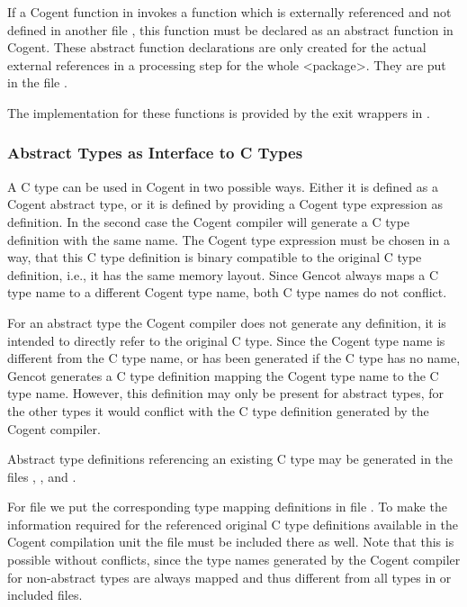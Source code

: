 If a Cogent function in  invokes a function which is externally referenced and not defined in another
file , this function must be declared as an abstract function in Cogent. These abstract function declarations
are only created for the actual
external references in a processing step for the whole <package>. They are put in the file .

The implementation for these functions is provided by the exit wrappers in .

\subsubsection{Abstract Types as Interface to C Types}

A C type can be used in Cogent in two possible ways. Either it is defined as a Cogent abstract type, or it is defined by providing
a Cogent type expression as definition. In the second case the Cogent compiler will generate a C type definition with the
same name. The Cogent type expression must be chosen in a way, that this C type definition is binary compatible to the
original C type definition, i.e., it has the same memory layout. Since Gencot always maps a C type name to a different Cogent
type name, both C type names do not conflict.

For an abstract type the Cogent compiler does not generate any definition, it is intended to directly refer to the original
C type. Since the Cogent type name is different from the C type name, or has been generated if the C type has no name,
Gencot generates a C type definition mapping the Cogent type name to the C type name.
However, this definition may only be present for abstract types, for the other types it would conflict with the C type
definition generated by the Cogent compiler. 

Abstract type definitions referencing an existing C type may be generated in the files , 
, and . 

For file  we put the corresponding 
type mapping definitions in file . To make the information required for the referenced original 
C type definitions available in the Cogent compilation unit the file  must be 
included there as well. Note that this is 
possible without conflicts, since the type names generated by the Cogent compiler for non-abstract types are always
mapped and thus different from all types in  or included files.

